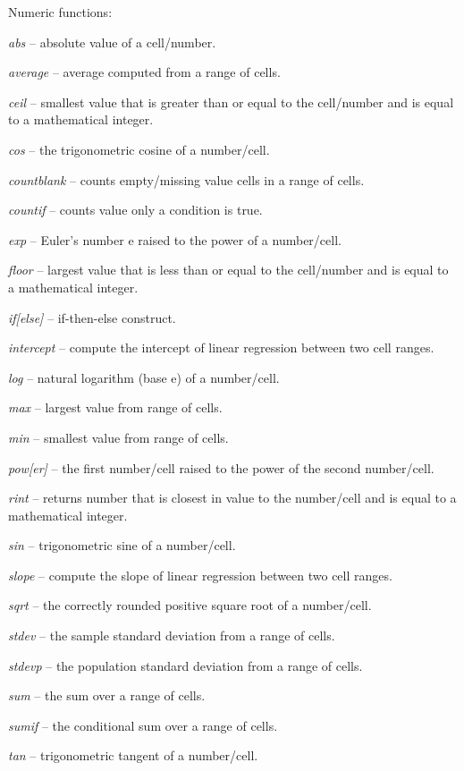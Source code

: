 \documentclass[a4paper]{book}
\begin{document}
\noindent Numeric functions:
\begin{tight_itemize}
	\item \textit{abs} -- absolute value of a cell/number.
	\item \textit{average} -- average computed from a range of cells.
	\item \textit{ceil} -- smallest value that is greater than or equal to the cell/number and is equal to a mathematical integer.
	\item \textit{cos} -- the trigonometric cosine of a number/cell.
	\item \textit{countblank} -- counts empty/missing value cells in a range of cells.
	\item \textit{countif} -- counts value only a condition is true.
	\item \textit{exp} -- Euler's number e raised to the power of a number/cell.
	\item \textit{floor} -- largest value that is less than or equal to the cell/number and is equal to a mathematical integer.
	\item \textit{if[else]} -- if-then-else construct.
	\item \textit{intercept} -- compute the intercept of linear regression between two cell ranges.
	\item \textit{log} -- natural logarithm (base e) of a number/cell.
	\item \textit{max} -- largest value from range of cells.
	\item \textit{min} -- smallest value from range of cells.
	\item \textit{pow[er]} -- the first number/cell raised to the power of the second number/cell.
	\item \textit{rint} -- returns number that is closest in value to the number/cell and is equal to a mathematical integer.
	\item \textit{sin} -- trigonometric sine of a number/cell.
	\item \textit{slope} -- compute the slope of linear regression between two cell ranges.
	\item \textit{sqrt} -- the correctly rounded positive square root of a number/cell.
	\item \textit{stdev} -- the sample standard deviation from a range of cells.
	\item \textit{stdevp} -- the population standard deviation from a range of cells.
	\item \textit{sum} -- the sum over a range of cells.
	\item \textit{sumif} -- the conditional sum over a range of cells.
	\item \textit{tan} -- trigonometric tangent of a number/cell.
\end{tight_itemize}
\end{document}
